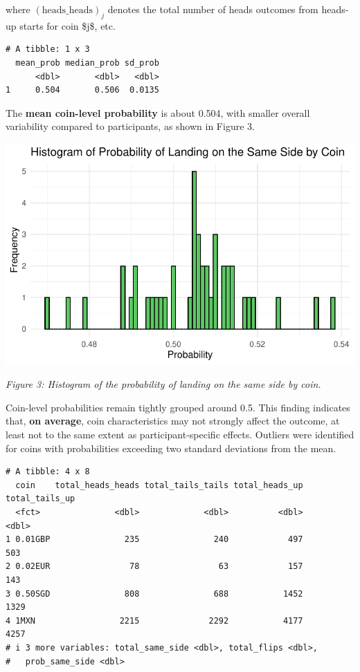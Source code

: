 \documentclass[
  letterpaper,
  DIV=11,
  numbers=noendperiod]{scrartcl}
\begin{document}
where \((\text{heads_heads})_j\) denotes the total number of heads
outcomes from heads-up starts for coin \$j\$, etc.

\begin{verbatim}
# A tibble: 1 x 3
  mean_prob median_prob sd_prob
      <dbl>       <dbl>   <dbl>
1     0.504       0.506  0.0135
\end{verbatim}

The \textbf{mean coin-level probability} is about 0.504, with smaller
overall variability compared to participants, as shown in Figure 3.

\includegraphics{Garcia-Vuksic-RMProject-2024_files/figure-pdf/unnamed-chunk-9-1.pdf}

\emph{Figure 3: Histogram of the probability of landing on the same side
by coin.}

Coin-level probabilities remain tightly grouped around 0.5. This finding
indicates that, \textbf{on average}, coin characteristics may not
strongly affect the outcome, at least not to the same extent as
participant-specific effects. Outliers were identified for coins with
probabilities exceeding two standard deviations from the mean.

\begin{verbatim}
# A tibble: 4 x 8
  coin    total_heads_heads total_tails_tails total_heads_up total_tails_up
  <fct>               <dbl>             <dbl>          <dbl>          <dbl>
1 0.01GBP               235               240            497            503
2 0.02EUR                78                63            157            143
3 0.50SGD               808               688           1452           1329
4 1MXN                 2215              2292           4177           4257
# i 3 more variables: total_same_side <dbl>, total_flips <dbl>,
#   prob_same_side <dbl>
\end{verbatim}
\end{document}
